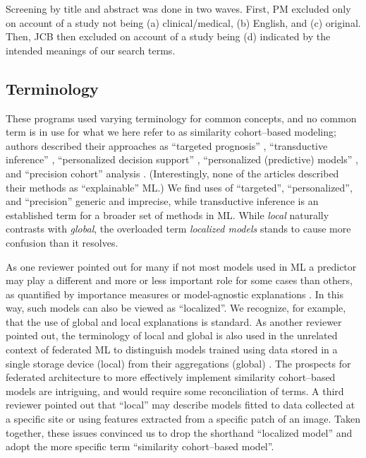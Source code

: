 \documentclass[sn-mathphys,Numbered,pdflatex]{sn-jnl}
\theoremstyle{remark}
\theoremstyle{definition}
\newcommand{\hl}[1]{#1}
\begin{document}
Screening by title and abstract was done in two waves. First, PM
excluded only on account of a study not being (a) clinical/medical, (b)
English, and (c) original. Then, JCB then excluded on account of a study
being (d) indicated by the intended meanings of our search terms.

\subsection*{\hl{Terminology}}\label{terminology}

These programs used varying terminology for common concepts, and no
common term is in use for what we here refer to as
\hl{similarity cohort--based modeling}; authors described their
approaches as ``targeted prognosis'' \citep{Mariuzzi1997},
``transductive inference'' \citep{Song2006}, ``personalized decision
support'' \citep{Lee2015}, ``personalized (predictive) models''
\citetext{\citealp[in contrast to ``local
models'']{Liang2015}; \citealp{Ng2015}; \citealp{Wang2019}; \citealp{Ma2020}; \citealp{Liu2022}; \citealp{Doborjeh2022}},
and ``precision cohort'' analysis \citep{Wang2019, Tang2021, Ng2021}.
\hl{(Interestingly, none of the articles described their methods as ``explainable'' ML.)}
We find uses of ``targeted'', ``personalized'', and ``precision''
generic and imprecise, while transductive inference is an established
term for a broader set of methods in ML.
\hl{While \emph{local} naturally contrasts with \emph{global}, the overloaded term \emph{localized models} stands to cause more confusion than it resolves.}

\hl{As one reviewer pointed out for many if not most models used in ML a predictor may play a different and more or less important role for some cases than others, as quantified by importance measures or model-agnostic explanations }\citep{Biecek2021, Molnar2023}\hl{. In this way, such models can also be viewed as ``localized''. We recognize, for example, that the use of global and local explanations is standard. As another reviewer pointed out, the terminology of local and global is also used in the unrelated context of federated ML to distinguish models trained using data stored in a single storage device (local) from their aggregations (global) }\citep{Moshawrab2023, Brauneck2023}\hl{. The prospects for federated architecture to more effectively implement similarity cohort--based models are intriguing, and would require some reconciliation of terms.
A third reviewer pointed out that ``local'' may describe models fitted to data collected at a specific site or using features extracted from a specific patch of an image. Taken together, these issues convinced us to drop the shorthand ``localized model'' and adopt the more specific term ``similarity cohort--based model''.}
\end{document}
